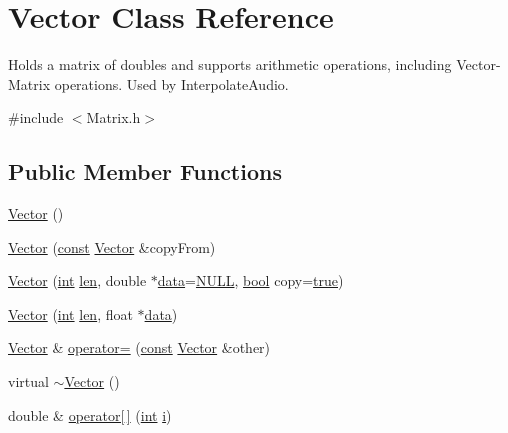 \hypertarget{class_vector}{}\section{Vector Class Reference}
\label{class_vector}


Holds a matrix of doubles and supports arithmetic operations, including Vector-\/\+Matrix operations. Used by Interpolate\+Audio.  




{\ttfamily \#include $<$Matrix.\+h$>$}

\subsection*{Public Member Functions}
\begin{DoxyCompactItemize}
\item 
\hyperlink{class_vector_a6f80c73b5f18dcf3f8e36065bdc8b9e5}{Vector} ()
\item 
\hyperlink{class_vector_aa2218c168e40e0a82e110a6aa4f0fc22}{Vector} (\hyperlink{getopt1_8c_a2c212835823e3c54a8ab6d95c652660e}{const} \hyperlink{class_vector}{Vector} \&copy\+From)
\item 
\hyperlink{class_vector_ae28cce0873a84ac2f6bab50b6f5c3153}{Vector} (\hyperlink{xmltok_8h_a5a0d4a5641ce434f1d23533f2b2e6653}{int} \hyperlink{lib_2expat_8h_af86d325fecfc8f47b61fbf5a5146f582}{len}, double $\ast$\hyperlink{lib_2expat_8h_ac39e72a1de1cb50dbdc54b08d0432a24}{data}=\hyperlink{px__mixer_8h_a070d2ce7b6bb7e5c05602aa8c308d0c4}{N\+U\+LL}, \hyperlink{mac_2config_2i386_2lib-src_2libsoxr_2soxr-config_8h_abb452686968e48b67397da5f97445f5b}{bool} copy=\hyperlink{mac_2config_2i386_2lib-src_2libsoxr_2soxr-config_8h_a41f9c5fb8b08eb5dc3edce4dcb37fee7}{true})
\item 
\hyperlink{class_vector_a127a92bbacf31486af4479e92914ff96}{Vector} (\hyperlink{xmltok_8h_a5a0d4a5641ce434f1d23533f2b2e6653}{int} \hyperlink{lib_2expat_8h_af86d325fecfc8f47b61fbf5a5146f582}{len}, float $\ast$\hyperlink{lib_2expat_8h_ac39e72a1de1cb50dbdc54b08d0432a24}{data})
\item 
\hyperlink{class_vector}{Vector} \& \hyperlink{class_vector_a31810b59e0d9106aa17ecf6ae1cfbaf1}{operator=} (\hyperlink{getopt1_8c_a2c212835823e3c54a8ab6d95c652660e}{const} \hyperlink{class_vector}{Vector} \&other)
\item 
virtual \hyperlink{class_vector_a2eb3c49587a4f12cade7895ccb73f6a0}{$\sim$\+Vector} ()
\item 
double \& \hyperlink{class_vector_a8cc4aefe1d880f18feac3426ea8d933e}{operator\mbox{[}$\,$\mbox{]}} (\hyperlink{xmltok_8h_a5a0d4a5641ce434f1d23533f2b2e6653}{int} \hyperlink{checksum_8c_ab80e330a3bc9e38c1297fe17381e92b4}{i})

\end{DoxyCompactItemize}
